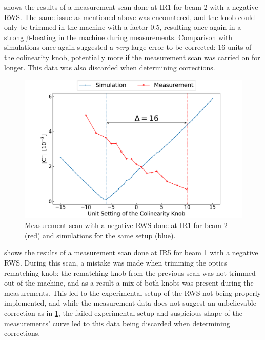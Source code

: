  shows the results of a measurement scan done at IR\num{1} for beam \num{2} with a negative RWS.
The same issue as mentioned above was encountered, and the knob could only be trimmed in the machine with a factor \num{0.5}, resulting once again in a strong \(\beta\)-beating in the machine during measurements.
Comparison with simulations once again suggested a \textit{very} large error to be corrected: \num{16} units of the colinearity knob, potentially more if the measurement scan was carried on for longer.
This data was also discarded when determining corrections.

\begin{figure}[!htb]
    \centering
    \includegraphics*[width=\textwidth]{Figures/Appendices/rws_measurement_ir1_b2_neg.pdf}
    \caption{Measurement scan with a negative RWS done at IR\num{1} for beam \num{2} (\textcolor{mplr}{red}) and simulations for the same setup (\textcolor{mplblue}{blue}).}
    \label{figure:ir1_b2_neg_measurement}
\end{figure}

 shows the results of a measurement scan done at IR\num{5} for beam \num{1} with a negative RWS.
During this scan, a mistake was made when trimming the optics rematching knob: the rematching knob from the previous scan was not trimmed out of the machine, and as a result a mix of both knobs was present during the measurements.
This led to the experimental setup of the RWS not being properly implemented, and while the measurement data does not suggest an unbelievable correction as in \cref{figure:ir1_b2_neg_measurement}, the failed experimental setup and suspicious shape of the measurements'  curve led to this data being discarded when determining corrections.

